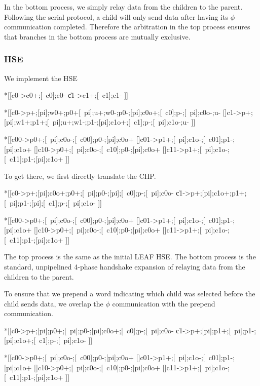 \documentclass{article}
\begin{document}
\noindent
In the bottom process, we simply relay data from the children to the parent.
Following the serial protocol, a child will only send data after having 
its $\phi$ communication completed. Therefore the arbitration in
the top process ensures that branches in the bottom process are mutually 
exclusive. \\

\subsubsection*{HSE}

We implement the HSE

\begin{hse}
*[[c0\phi->c0+;[~c0\phi];c0-
  \|c1\phi->c1+;[~c1\phi];c1-
 ]]

*[[c0->p\phi+;[pi];w0+;p0+[~pi];u+;w0-;p0-;[pi];c0o+;[~c0];p\phi-;[~pi];c0o-;u-
  []c1->p\phi+;[pi];w1+;p1+;[~pi];u+;w1-;p1-;[pi];c1o+;[~c1];p\phi-;[~pi];c1o-;u-
 ]]

*[[c00->p0+;[~pi];c0o-;[~c00];p0-;[pi];c0o+
  []c01->p1+;[~pi];c1o-;[~c01];p1-;[pi];c1o+
  []c10->p0+;[~pi];c0o-;[~c10];p0-;[pi];c0o+
  []c11->p1+;[~pi];c1o-;[~c11];p1-;[pi];c1o+
 ]]
\end{hse}

\noindent
To get there, we first directly translate the CHP.

\begin{hse}
*[[c0\phi->p\phi+;[pi];c0o+;p0+;[~pi];p0-;[pi];[~c0\phi];p\phi-;[~pi];c0o-
  \|c1\phi->p\phi+;[pi];c1o+;p1+;[~pi];p1-;[pi];[~c1\phi];p\phi-;[~pi];c1o-
 ]]

*[[c00->p0+;[~pi];c0o-;[~c00];p0-;[pi];c0o+
  []c01->p1+;[~pi];c1o-;[~c01];p1-;[pi];c1o+
  []c10->p0+;[~pi];c0o-;[~c10];p0-;[pi];c0o+
  []c11->p1+;[~pi];c1o-;[~c11];p1-;[pi];c1o+
 ]]
\end{hse}

\noindent
The top process is the same as the initial LEAF HSE. The bottom process is the 
standard, unpipelined 4-phase handshake expansion of relaying data from the 
children to the parent.

\noindent
To ensure that we prepend a word indicating which child was selected before
the child sends data, we overlap the $\phi$ communication with the 
prepend communication.

\begin{hse}
*[[c0\phi->p\phi+;[pi];p0+;[~pi];p0-;[pi];c0o+;[~c0\phi];p\phi-;[~pi];c0o-
  \|c1\phi->p\phi+;[pi];p1+;[~pi];p1-;[pi];c1o+;[~c1\phi];p\phi-;[~pi];c1o-
 ]]

*[[c00->p0+;[~pi];c0o-;[~c00];p0-;[pi];c0o+
  []c01->p1+;[~pi];c1o-;[~c01];p1-;[pi];c1o+
  []c10->p0+;[~pi];c0o-;[~c10];p0-;[pi];c0o+
  []c11->p1+;[~pi];c1o-;[~c11];p1-;[pi];c1o+
 ]]
\end{hse}
\end{document}
